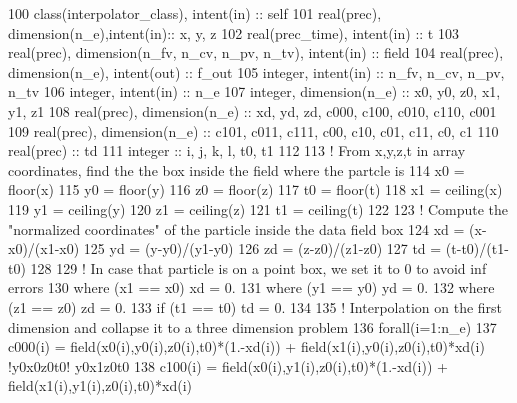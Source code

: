 \begin{DoxyCode}
100     \textcolor{keywordtype}{class}(interpolator\_class), \textcolor{keywordtype}{intent(in)} :: self
101     \textcolor{keywordtype}{real(prec)}, \textcolor{keywordtype}{dimension(n\_e)},\textcolor{keywordtype}{intent(in)}:: x, y, z
102     \textcolor{keywordtype}{real(prec\_time)}, \textcolor{keywordtype}{intent(in)} :: t
103     \textcolor{keywordtype}{real(prec)}, \textcolor{keywordtype}{dimension(n\_fv, n\_cv, n\_pv, n\_tv)}, \textcolor{keywordtype}{intent(in)} :: field
104     \textcolor{keywordtype}{real(prec)}, \textcolor{keywordtype}{dimension(n\_e)}, \textcolor{keywordtype}{intent(out)} :: f\_out
105     \textcolor{keywordtype}{integer}, \textcolor{keywordtype}{intent(in)} :: n\_fv, n\_cv, n\_pv, n\_tv
106     \textcolor{keywordtype}{integer}, \textcolor{keywordtype}{intent(in)} :: n\_e
107     \textcolor{keywordtype}{integer}, \textcolor{keywordtype}{dimension(n\_e)} :: x0, y0, z0, x1, y1, z1
108     \textcolor{keywordtype}{real(prec)}, \textcolor{keywordtype}{dimension(n\_e)} :: xd, yd, zd, c000, c100, c010, c110, c001
109     \textcolor{keywordtype}{real(prec)}, \textcolor{keywordtype}{dimension(n\_e)} :: c101, c011, c111, c00, c10, c01, c11, c0, c1
110     \textcolor{keywordtype}{real(prec)} :: td
111     \textcolor{keywordtype}{integer} :: i, j, k, l, t0, t1
112 
113     \textcolor{comment}{! From x,y,z,t in array coordinates, find the the box inside the field where the partcle is}
114     x0 = floor(x)
115     y0 = floor(y)
116     z0 = floor(z)
117     t0 = floor(t)
118     x1 = ceiling(x)
119     y1 = ceiling(y)
120     z1 = ceiling(z)
121     t1 = ceiling(t)
122 
123     \textcolor{comment}{! Compute the "normalized coordinates" of the particle inside the data field box}
124     xd = (x-x0)/(x1-x0)
125     yd = (y-y0)/(y1-y0)
126     zd = (z-z0)/(z1-z0)
127     td = (t-t0)/(t1-t0)
128 
129     \textcolor{comment}{! In case that particle is on a point box, we set it to 0 to avoid inf errors}
130     \textcolor{keywordflow}{where} (x1 == x0) xd = 0.
131     \textcolor{keywordflow}{where} (y1 == y0) yd = 0.
132     \textcolor{keywordflow}{where} (z1 == z0) zd = 0.
133     \textcolor{keywordflow}{if} (t1 == t0)    td = 0.
134 
135     \textcolor{comment}{! Interpolation on the first dimension and collapse it to a three dimension problem}
136     \textcolor{keywordflow}{forall}(i=1:n\_e)
137         c000(i) = field(x0(i),y0(i),z0(i),t0)*(1.-xd(i)) + field(x1(i),y0(i),z0(i),t0)*xd(i) \textcolor{comment}{!y0x0z0t0! 
       y0x1z0t0}
138         c100(i) = field(x0(i),y1(i),z0(i),t0)*(1.-xd(i)) + field(x1(i),y1(i),z0(i),t0)*xd(i)

\end{DoxyCode}
